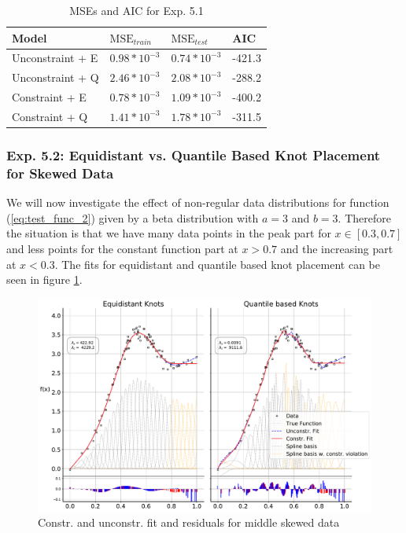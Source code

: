 \documentclass[10pt,a4paper]{article}
\begin{document}
\begin{table}[H]
	\centering
	\begin{tabular}{|l|l|l|l|}
		\hline
		\textbf{Model} & \textbf{$\text{MSE}_{train}$} & \textbf{$\text{MSE}_{test}$}  & \textbf{AIC} \\ \hline \toprule
		Unconstraint + E  & $0.98 * 10^{-3}$  & $0.74 * 10^{-3}$ & -421.3       \\ \hline
		Unconstraint + Q  & $2.46 * 10^{-3}$  & $2.08 * 10^{-3}$ & -288.2       \\ \hline
		Constraint + E    & $0.78 * 10^{-3}$  & $1.09 * 10^{-3}$ & -400.2       \\ \hline
		Constraint + Q    & $1.41 * 10^{-3}$  & $1.78 * 10^{-3}$ & -311.5      \\ \hline \bottomrule
	\end{tabular}
	\caption{MSEs and AIC for Exp. 5.1}
	\label{tab:metrics_51}
\end{table}


\subsubsection{Exp. 5.2: Equidistant vs. Quantile Based Knot Placement for Skewed Data}

We will now investigate the effect of non-regular data distributions for function (\ref{eq:test_func_2}) given by a beta distribution with $a = 3$ and $b = 3$. Therefore the situation is that we have many data points in the peak part for $x \in [0.3, 0.7]$ and less points for the constant function part at $x > 0.7$ and the increasing part at $x < 0.3$. The fits for equidistant and quantile based knot placement can be seen in figure \ref{fig:fit_middle_skew_250}. 

\begin{figure}[H]
	\centering
	\includegraphics[width=\columnwidth]{../thesisplots/exp_beta/exp_middle_skewed_data_ndata_250_rseed_1.pdf}
	\caption{Constr. and unconstr. fit and residuals for middle skewed data}
	\label{fig:fit_middle_skew_250}
\end{figure}
\end{document}
